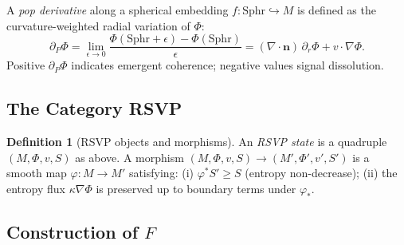 \documentclass[12pt, a4paper]{article}
\theoremstyle{definition}
\newtheorem{definition}[theorem]{Definition}
\theoremstyle{remark}
\begin{document}
A \emph{pop derivative} along a spherical embedding
$f : \mathrm{Sphr} \hookrightarrow M$ is defined as the curvature-weighted radial
variation of $\Phi$:
\begin{equation}
  \partial_P \Phi = \lim_{\epsilon \to 0}
  \frac{\Phi(\mathrm{Sphr}+\epsilon) - \Phi(\mathrm{Sphr})}{\epsilon}
  = (\nabla \cdot \mathbf{n})\,\partial_r \Phi + v \cdot \nabla\Phi.
  \label{eq:pop-deriv}
\end{equation}
Positive $\partial_P \Phi$ indicates emergent coherence; negative values signal
dissolution.

\subsection{The Category RSVP}

\begin{definition}[RSVP objects and morphisms]
An \emph{RSVP state} is a quadruple $(M, \Phi, v, S)$ as above. A morphism
$(M, \Phi, v, S) \to (M', \Phi', v', S')$ is a smooth map $\varphi : M \to M'$
satisfying: (i) $\varphi^* S' \ge S$ (entropy non-decrease); (ii) the entropy
flux $\kappa\nabla\Phi$ is preserved up to boundary terms under $\varphi_*$.
\end{definition}

\subsection{Construction of \texorpdfstring{$F$}{F}}
\end{document}

